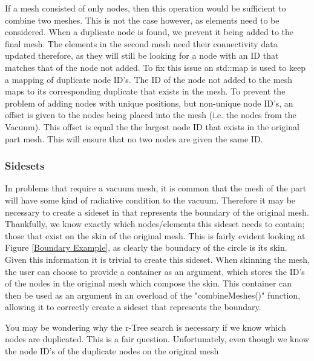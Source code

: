 \documentclass[12pt, letterpaper]{article}
\begin{document}
If a mesh consisted of only nodes, then this operation would be sufficient to combine two meshes. This is not the case however, as elements need to be considered. When a duplicate node is found, we prevent it being added to the final mesh. The elements in the second mesh need their connectivity data updated therefore, as they will still be looking for a node with an ID that matches that of the node not added. To fix this issue an std::map is used to keep a mapping of duplicate node ID's. The ID of the node not added to the mesh maps to its corresponding duplicate that exists in the mesh. To prevent the problem of adding nodes with unique positions, but non-unique node ID's, an offset is given to the nodes being placed into the mesh (i.e. the nodes from the Vacuum). This offset is equal the the largest node ID that exists in the original part mesh. This will ensure that no two nodes are given the same ID.

\subsubsection{Sidesets}
In problems that require a vacuum mesh, it is common that the mesh of the part will have some kind of radiative condition to the vacuum. Therefore it may be necessary to create a sideset in that represents the boundary of the original mesh. Thankfully, we know exactly which nodes/elements this sideset needs to contain; those that exist on the skin of the original mesh. This is fairly evident looking at Figure \ref{Boundary Example}, as clearly the boundary of the circle is its skin. Given this information it is trivial to create this sideset. When skinning the mesh, the user can choose to provide a container as an argument, which stores the ID's of the nodes in the original mesh which compose the skin. This container can then be used as an argument in an overload of the "combineMeshes()" function, allowing it to correctly create a sideset that represents the boundary.

You may be wondering why the r-Tree search is necessary if we know which nodes are duplicated. This is a fair question. Unfortunately, even though we know the node ID's of the duplicate nodes on the original mesh
\end{document}
